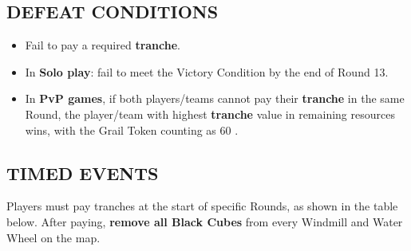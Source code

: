 \begin{multicols*}{2}
\subsection*{\MakeUppercase{Defeat Conditions}}

\begin{itemize}
  \item Fail to pay a required \textbf{tranche}.
  \item In \textbf{Solo play}: fail to meet the Victory Condition by the end of Round 13.
  \item In \textbf{PvP games}, if both players/teams cannot pay their \textbf{tranche} in the same Round, the player/team with highest \textbf{tranche} value in remaining resources wins, with the Grail Token counting as 60 .
\end{itemize}

\subsection*{\MakeUppercase{Timed Events}}

Players must pay tranches at the start of specific Rounds, as shown in the table below. After paying, \textbf{remove all Black Cubes} from every Windmill and Water Wheel on the map.




\end{multicols*}


